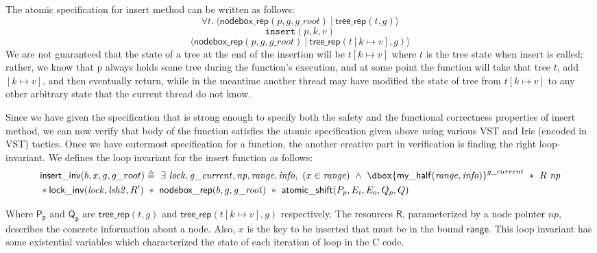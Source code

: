 \documentclass[acmsmall,screen]{acmart}\settopmatter{printfolios=true}
\newcommand\dboxed[1]{\dbox{\ensuremath{#1}}}
\newcommand{\ghost}[2]{\ensuremath{\dboxed{#1}^{#2}}}
\begin{document}
The atomic specification for insert method can be written as follows:
$$\forall t.\ \langle \mathsf{nodebox\_rep}(p,g,g\_root)\ |\ \mathsf{tree\_rep}(t,g)\rangle $$ 
$$\texttt{insert}(p,k,v)$$
$$\langle \mathsf{nodebox\_rep}(p,g,g\_root)\ |\ \mathsf{tree\_rep}(t[k\mapsto v],g)\rangle $$
We are not guaranteed that the state of  a tree at the end of the insertion will be $t[k\mapsto v]$ where $t$ is the tree state when insert is called; rather, we know that p always holds some tree during the function's execution, and at some point the function will take that tree $t$, add $[k\mapsto v]$, and then eventually return, while in the meantime another thread may have modified the state of tree from $t[k\mapsto v]$ to any other arbitrary state that the current thread do not know.

Since we have given the specification that is strong enough to specify both the safety and the functional correctness properties of insert method, we can now verify that body of the function satisfies the atomic specification given above using various VST and Iris (encoded in VST) tactics. Once we have outermost specification for a function, the another creative part in verification is finding the right loop-invariant. We defines the loop invariant for the insert function as follows: 
\begin{align*} &\mathsf{insert\_inv}(b, x, g, g\_root) \triangleq\ \exists\ \mathit{lock},\mathit{g\_current},\mathit{np},\mathit{range},\mathit{info},\ (x\in \mathit{range})\ \land \ \ghost{\mathsf{my\_half}(\mathit{range},\mathit{info})}{g\_current}\ *\ R\ \mathit{np}\\& * \mathsf{lock\_inv}(\mathit{lock},\mathit{lsh2},R')\ *\ \mathsf{nodebox\_rep}(b,g,\mathit{g\_root})\ *\ \mathsf{atomic\_shift} (P_p,E_i,E_o,Q_p,Q) \end{align*}   

Where $\mathsf{P_p}$ and $\mathsf{Q_p}$ are $\mathsf{tree\_rep}(t,g)$ and $\mathsf{tree\_rep}(t[k\mapsto v],g)$ respectively. The resources $\mathsf{R}$, parameterized by a node pointer $np$, describes the concrete information about a node. Also, $x$ is the key to be inserted that must be in the bound $\mathsf{range}$.  This loop invariant has some existential variables which characterized the state of each iteration of loop in the C code.
\end{document}
